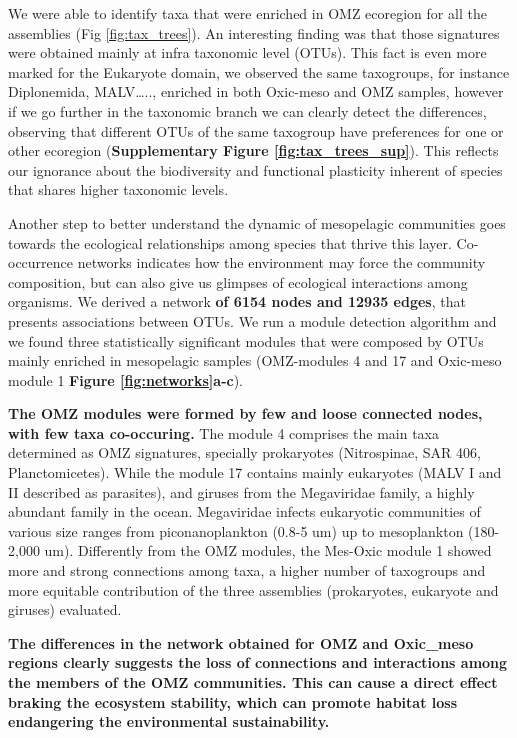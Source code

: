 \documentclass[fleqn,10pt]{wlscirep}
\begin{document}
We were able to identify taxa that were enriched in OMZ ecoregion for all the assemblies (Fig \ref{fig:tax_trees}). An interesting finding was that those signatures were obtained mainly at infra taxonomic level (OTUs). This fact is even more marked for the Eukaryote domain, we observed the same taxogroups, for instance Diplonemida, MALV….., enriched in both Oxic-meso and OMZ samples, however if we go further in the taxonomic branch we can clearly detect the differences, observing that different OTUs of the same taxogroup have preferences for one or other ecoregion (\textbf{Supplementary Figure \ref{fig:tax_trees_sup}}). This reflects our ignorance about the biodiversity and functional plasticity inherent of species that shares higher taxonomic levels.

Another step to better understand the dynamic of mesopelagic communities goes towards the ecological relationships among species that thrive this layer. Co-occurrence networks indicates how the environment may force the community composition, but can also give us glimpses of ecological interactions among organisms. We derived a network \textbf{of 6154 nodes and 12935 edges}, that presents associations between OTUs. We run a module detection algorithm and we found three statistically significant modules that were composed by OTUs mainly enriched in mesopelagic samples (OMZ-modules 4 and 17 and Oxic-meso module 1 \textbf{Figure \ref{fig:networks}a-c}).

\textbf{The OMZ modules were formed by few and loose connected nodes, with few taxa co-occuring.} The module 4 comprises the main taxa determined as OMZ signatures, specially prokaryotes (Nitrospinae, SAR 406, Planctomicetes). While the module 17 contains mainly eukaryotes (MALV I and II described as parasites), and giruses from the Megaviridae family, a highly abundant family in the ocean. Megaviridae infects eukaryotic communities of various size ranges from piconanoplankton (0.8-5 um) up to mesoplankton (180-2,000 um). Differently from the OMZ modules, the Mes-Oxic module 1 showed more and strong connections among taxa, a higher number of taxogroups and more equitable contribution of the three assemblies (prokaryotes, eukaryote and giruses) evaluated.

\textbf{The differences in the network obtained for OMZ and Oxic\_meso regions clearly suggests the loss of connections and interactions among the members of the OMZ communities. This can cause a direct effect braking the ecosystem stability, which can promote habitat loss endangering the environmental sustainability.}
\end{document}
